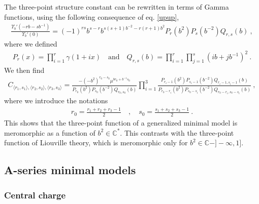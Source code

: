 \documentclass[12pt, a4paper, notitlepage, twoside]{report}
\numberwithin{equation}{section}
\theoremstyle{break}
\begin{document}
The three-point structure constant can be rewritten in terms of Gamma functions, using the following consequence of eq. \eqref{upup},
\begin{align}
 \frac{\Upsilon_b'(-rb-sb^{-1})}{\Upsilon_b'(0)} = (-1)^{rs} b^{s-r} b^{s(s+1)b^{-2}-r(r+1)b^2} P_r(b^2)P_s(b^{-2}) Q_{r,s}(b)\ ,
\end{align}
where we defined
\begin{align}
 P_r(x) = \prod_{i=1}^r \gamma(1+ix) \quad \text{and} \quad Q_{r,s}(b) = \prod_{i=1}^r \prod_{j=1}^s (ib+jb^{-1})^2\ .
\end{align}
We then find
\begin{align}
 C_{\langle r_1,s_1\rangle ,\langle r_2,s_2\rangle ,\langle r_3,s_3 \rangle} =  \frac{-(-b^2)^{r_0-s_0}\mu^{br_0 + b^{-1}s_0}}{P_{r_0}(b^2)P_{s_0}(b^{-2})Q_{r_0,s_0}(b)} \prod_{i=1}^3 \frac{P_{r_i-1}(b^2)P_{s_i-1}(b^{-2}) Q_{r_i-1,s_i-1}(b)}{P_{r_0-r_i}(b^2)P_{s_0-s_i}(b^{-2}) Q_{r_0-r_i,s_0-s_i}(b)} \ ,
\label{cpqb}
\end{align}
where we introduce the notations 
\begin{align}
 r_0 = \frac{r_1+r_2+r_3-1}{2} \quad , \quad s_0=\frac{s_1+s_2+s_3-1}{2}\ .
\end{align}
This shows that the three-point function of a generalized minimal model is meromorphic as a function of $b^2\in {\mathbb{C}}^*$.
This contrasts with the three-point function of Liouville theory, which is
meromorphic only for $b^2\in \mathbb{C}-]-\infty, 1]$. 


\subsection{A-series minimal models \label{secamm}}

\subsubsection{Central charge}
\end{document}
